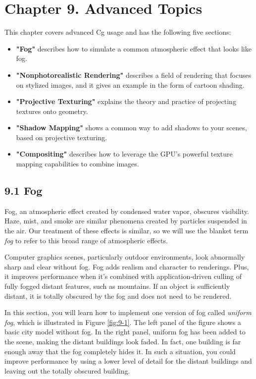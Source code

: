 \documentclass[../main.tex]{subfiles}
\begin{document}
\chapter{Chapter 9. Advanced Topics}

This chapter covers advanced Cg usage and has the following five sections:

\begin{itemize}
\item \textbf{"Fog"} describes how to simulate a common atmospheric effect that looks like fog.
\item \textbf{"Nonphotorealistic Rendering"} describes a field of rendering that focuses on stylized images, and it gives an example in the form of cartoon shading.
\item \textbf{"Projective Texturing"} explains the theory and practice of projecting textures onto geometry.
\item \textbf{"Shadow Mapping"} shows a common way to add shadows to your scenes, based on projective texturing.
\item \textbf{"Compositing"} describes how to leverage the GPU's powerful texture mapping capabilities to combine images.
\end{itemize}

\section{9.1 Fog}

Fog, an atmospheric effect created by condensed water vapor, obscures visibility. Haze, mist, and smoke are similar phenomena created by particles suspended in the air. Our treatment of these effects is similar, so we will use the blanket term \textit{fog} to refer to this broad range of atmospheric effects.

Computer graphics scenes, particularly outdoor environments, look abnormally sharp and clear without fog. Fog adds realism and character to renderings. Plus, it improves performance when it's combined with application-driven culling of fully fogged distant features, such as mountains. If an object is sufficiently distant, it is totally obscured by the fog and does not need to be rendered.

In this section, you will learn how to implement one version of fog called \textit{uniform fog}, which is illustrated in Figure \ref{fig:9-1}. The left panel of the figure shows a basic city model without fog. In the right panel, uniform fog has been added to the scene, making the distant buildings look faded. In fact, one building is far enough away that the fog completely hides it. In such a situation, you could improve performance by using a lower level of detail for the distant buildings and leaving out the totally obscured building.
\end{document}
